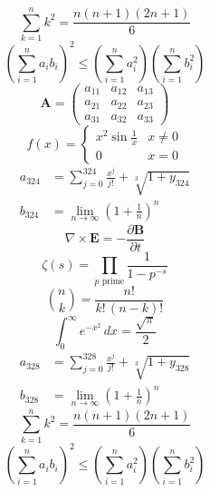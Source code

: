 \documentclass[11pt]{article}
\begin{document}
\begin{equation}
\sum_{k=1}^{n} k^2 = \frac{n(n+1)(2n+1)}{6}
\end{equation}
\begin{equation}
\left( \sum_{i=1}^n a_i b_i \right)^2 \le \left(\sum_{i=1}^n a_i^2\right)\left(\sum_{i=1}^n b_i^2\right)
\end{equation}
\begin{equation}
\mathbf{A} = \begin{pmatrix} a_{11} & a_{12} & a_{13} \\ a_{21} & a_{22} & a_{23} \\ a_{31} & a_{32} & a_{33} \end{pmatrix}
\end{equation}
\begin{equation}
f(x) = \begin{cases} x^2 \sin\frac{1}{x} & x \ne 0 \\ 0 & x = 0 \end{cases}
\end{equation}
\begin{align}
  a_{324} &= \sum_{j=0}^{324} \frac{x^j}{j!} + \sqrt[3]{1+y_{324}} \\
  b_{324} &= \lim_{n\to\infty} \left(1+\frac{1}{n}\right)^{n}
\end{align}
\begin{equation}
\nabla \times \mathbf{E} = -\frac{\partial \mathbf{B}}{\partial t}
\end{equation}
\begin{equation}
\zeta(s) = \prod_{p \text{ prime}} \frac{1}{1 - p^{-s}}
\end{equation}
\begin{equation}
\binom{n}{k} = \frac{n!}{k!\,(n-k)!}
\end{equation}
\begin{equation}
\int_0^\infty e^{-x^2}\,dx = \frac{\sqrt{\pi}}{2}
\end{equation}
\begin{align}
  a_{328} &= \sum_{j=0}^{328} \frac{x^j}{j!} + \sqrt[3]{1+y_{328}} \\
  b_{328} &= \lim_{n\to\infty} \left(1+\frac{1}{n}\right)^{n}
\end{align}
\begin{equation}
\sum_{k=1}^{n} k^2 = \frac{n(n+1)(2n+1)}{6}
\end{equation}
\begin{equation}
\left( \sum_{i=1}^n a_i b_i \right)^2 \le \left(\sum_{i=1}^n a_i^2\right)\left(\sum_{i=1}^n b_i^2\right)
\end{equation}
\end{document}
